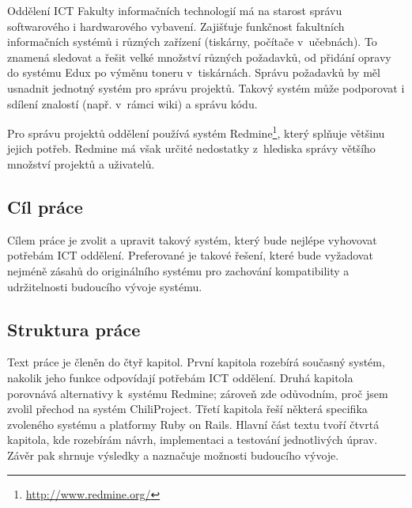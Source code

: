 \documentclass[thesis=B,czech]{FITthesis}[2012/05/02]
\begin{document}

\begin{introduction}

Oddělení ICT Fakulty informačních technologií má na starost správu softwarového i hardwarového vybavení. Zajišťuje funkčnost fakultních informačních systémů i různých zařízení (tiskárny, počítače v~učebnách). To znamená sledovat a řešit velké množství různých požadavků, od přidání opravy do systému Edux po výměnu toneru v~tiskárnách. Správu požadavků by měl usnadnit jednotný systém pro správu projektů. Takový systém může podporovat i sdílení znalostí (např. v~rámci \gls{wiki}) a správu kódu.

Pro správu projektů oddělení používá systém Redmine\footnote{\url{http://www.redmine.org/}}, který splňuje většinu jejich potřeb. Redmine má však určité nedostatky z~hlediska správy většího množství projektů a uživatelů.

\subsection{Cíl práce}

Cílem práce je zvolit a upravit takový systém, který bude nejlépe vyhovovat potřebám ICT oddělení. Preferované je takové řešení, které bude vyžadovat nejméně zásahů do originálního systému pro zachování kompatibility a udržitelnosti budoucího vývoje systému.

\subsection{Struktura práce}

Text práce je členěn do čtyř kapitol. První kapitola rozebírá současný systém, nakolik jeho funkce odpovídají potřebám ICT oddělení. Druhá kapitola porovnává alternativy k~systému Redmine; zároveň zde odůvodním, proč jsem zvolil přechod na systém ChiliProject. Třetí kapitola řeší některá specifika zvoleného systému a platformy Ruby on Rails. Hlavní část textu tvoří čtvrtá kapitola, kde rozebírám návrh, implementaci a testování jednotlivých úprav. Závěr pak shrnuje výsledky a naznačuje možnosti budoucího vývoje.

\end{introduction}
\end{document}
